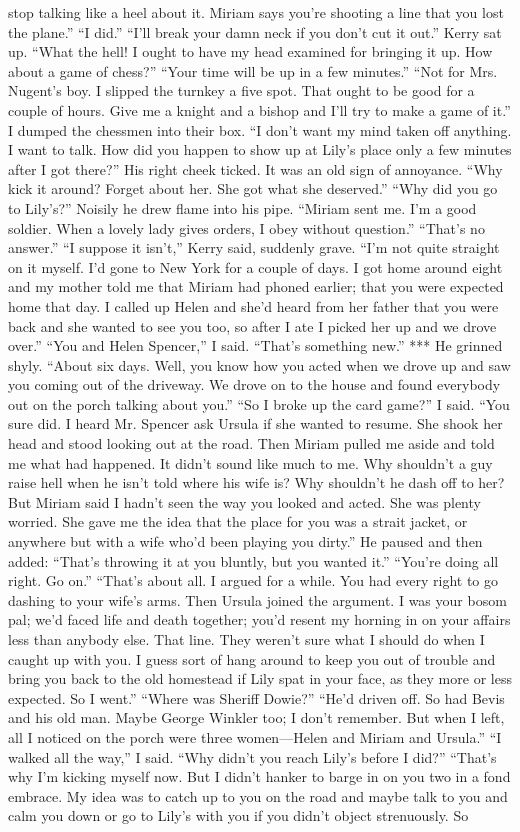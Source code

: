 \documentclass{novel}
\begin{document}
stop talking like a heel about it. Miriam says you’re shooting a line that you lost the plane.” “I did.” “I’ll break your damn neck if you don’t cut it out.” Kerry sat up. “What the hell! I ought to have my head examined for bringing it up. How about a game of chess?” “Your time will be up in a few minutes.” “Not for Mrs. Nugent’s boy. I slipped the turnkey a five spot. That ought to be good for a couple of hours. Give me a knight and a bishop and I’ll try to make a game of it.” I dumped the chessmen into their box. “I don’t want my mind taken off anything. I want to talk. How did you happen to show up at Lily’s place only a few minutes after I got there?” His right cheek ticked. It was an old sign of annoyance. “Why kick it around? Forget about her. She got what she deserved.” “Why did you go to Lily’s?” Noisily he drew flame into his pipe. “Miriam sent me. I’m a good soldier. When a lovely lady gives orders, I obey without question.” “That’s no answer.” “I suppose it isn’t,” Kerry said, suddenly grave. “I’m not quite straight on it myself. I’d gone to New York for a couple of days. I got home around eight and my mother told me that Miriam had phoned earlier; that you were expected home that day. I called up Helen and she’d heard from her father that you were back and she wanted to see you too, so after I ate I picked her up and we drove over.” “You and Helen Spencer,” I said. “That’s something new.” *** He grinned shyly. “About six days. Well, you know how you acted when we drove up and saw you coming out of the driveway. We drove on to the house and found everybody out on the porch talking about you.” “So I broke up the card game?” I said. “You sure did. I heard Mr. Spencer ask Ursula if she wanted to resume. She shook her head and stood looking out at the road. Then Miriam pulled me aside and told me what had happened. It didn’t sound like much to me. Why shouldn’t a guy raise hell when he isn’t told where his wife is? Why shouldn’t he dash off to her? But Miriam said I hadn’t seen the way you looked and acted. She was plenty worried. She gave me the idea that the place for you was a strait jacket, or anywhere but with a wife who’d been playing you dirty.” He paused and then added: “That’s throwing it at you bluntly, but you wanted it.” “You’re doing all right. Go on.” “That’s about all. I argued for a while. You had every right to go dashing to your wife’s arms. Then Ursula joined the argument. I was your bosom pal; we’d faced life and death together; you’d resent my horning in on your affairs less than anybody else. That line. They weren’t sure what I should do when I caught up with you. I guess sort of hang around to keep you out of trouble and bring you back to the old homestead if Lily spat in your face, as they more or less expected. So I went.” “Where was Sheriff Dowie?” “He’d driven off. So had Bevis and his old man. Maybe George Winkler too; I don’t remember. But when I left, all I noticed on the porch were three women—Helen and Miriam and Ursula.” “I walked all the way,” I said. “Why didn’t you reach Lily’s before I did?” “That’s why I’m kicking myself now. But I didn’t hanker to barge in on you two in a fond embrace. My idea was to catch up to you on the road and maybe talk to you and calm you down or go to Lily’s with you if you didn’t object strenuously. So 
\end{document}
